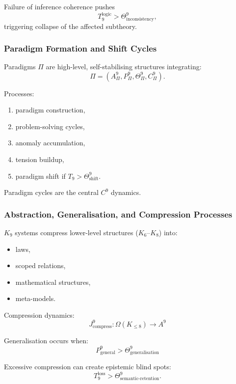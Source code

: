 Failure of inference coherence pushes
\[
T_9^{\text{logic}} > \Theta^9_{\text{inconsistency}},
\]
triggering collapse of the affected subtheory.

\subsubsection{Paradigm Formation and Shift Cycles}

Paradigms $\Pi$ are high-level, self-stabilising structures integrating:
\[
\Pi = (A^9_{\Pi}, P^9_{\Pi}, \Theta^9_{\Pi}, C^9_{\Pi}).
\]

Processes:
\begin{enumerate}
    \item paradigm construction,
    \item problem-solving cycles,
    \item anomaly accumulation,
    \item tension buildup,
    \item paradigm shift if $T_9 > \Theta^9_{\text{shift}}$.
\end{enumerate}

Paradigm cycles are the central $C^9$ dynamics.

\subsubsection{Abstraction, Generalisation, and Compression Processes}

$K_9$ systems compress lower-level structures ($K_6$–$K_8$) into:
\begin{itemize}
    \item laws,
    \item scoped relations,
    \item mathematical structures,
    \item meta-models.
\end{itemize}

Compression dynamics:
\[
J^9_{\text{compress}} : \Omega(K_{\leq 8}) \to A^9
\]

Generalisation occurs when:
\[
P^9_{\text{general}} > \Theta^9_{\text{generalisation}}
\]

Excessive compression can create epistemic blind spots:
\[
T_9^{\text{loss}} > \Theta^9_{\text{semantic-retention}}.
\]


